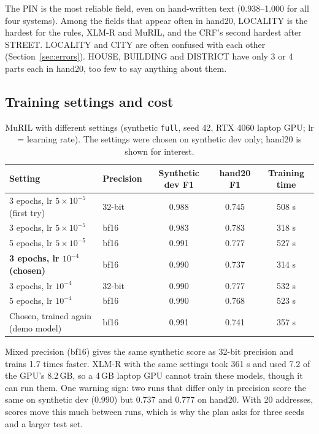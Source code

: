 \documentclass[11pt,a4paper]{article}
\newcommand{\code}[1]{\texttt{#1}}
\begin{document}
The PIN is the most reliable field, even on hand-written text (0.938--1.000 for all four systems). Among the fields
that appear often in hand20, LOCALITY is the hardest for the rules, \mbox{XLM-R} and MuRIL, and the CRF's second hardest after
STREET. LOCALITY and CITY are often confused with each other (Section~\ref{sec:errors}). HOUSE, BUILDING and DISTRICT
have only 3 or 4 parts each in hand20, too few to say anything about them.

\subsection{Training settings and cost}
\begin{table}[H]
\centering\small
\caption[MuRIL training settings and cost]{MuRIL with different settings (synthetic \code{full}, seed 42, RTX 4060 laptop GPU; lr = learning rate). The
settings were chosen on synthetic dev only; hand20 is shown for interest.}\label{tab:tuning}
\begin{tabular}{llccc}
\toprule
\textbf{Setting} & \textbf{Precision} & \textbf{Synthetic dev F1} & \textbf{hand20 F1} & \textbf{Training time}\\
\midrule
3 epochs, lr $5\times10^{-5}$ (first try) & 32-bit & 0.988 & 0.745 & 508 s\\
3 epochs, lr $5\times10^{-5}$ & bf16 & 0.983 & 0.783 & 318 s\\
5 epochs, lr $5\times10^{-5}$ & bf16 & 0.991 & 0.777 & 527 s\\
\textbf{3 epochs, lr $10^{-4}$ (chosen)} & bf16 & 0.990 & 0.737 & 314 s\\
3 epochs, lr $10^{-4}$ & 32-bit & 0.990 & 0.777 & 532 s\\
5 epochs, lr $10^{-4}$ & bf16 & 0.990 & 0.768 & 523 s\\
Chosen, trained again (demo model) & bf16 & 0.991 & 0.741 & 357 s\\
\bottomrule
\end{tabular}
\end{table}

Mixed precision (bf16) gives the same synthetic score as 32-bit precision and trains 1.7 times faster. \mbox{XLM-R} with the
same settings took 361 s and used 7.2 of the GPU's 8.2\,GB, so a 4\,GB laptop GPU cannot train these models, though
it can run them. One warning sign: two runs that differ only in precision score the same on synthetic dev (0.990) but
0.737 and 0.777 on hand20. With 20 addresses, scores move this much between runs, which is why the plan asks for
three seeds and a larger test set.
\end{document}
